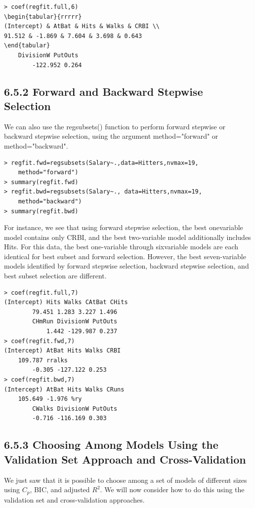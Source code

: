 \documentclass[10pt]{article}
\begin{document}
\begin{verbatim}
> coef(regfit.full,6)
\begin{tabular}{rrrrr} 
(Intercept) & AtBat & Hits & Walks & CRBI \\
91.512 & -1.869 & 7.604 & 3.698 & 0.643
\end{tabular}
    DivisionW PutOuts
        -122.952 0.264
\end{verbatim}

\subsection*{6.5.2 Forward and Backward Stepwise Selection}
We can also use the regsubsets() function to perform forward stepwise or backward stepwise selection, using the argument method="forward" or method="backward".

\begin{verbatim}
> regfit.fwd=regsubsets(Salary~.,data=Hitters,nvmax=19,
    method="forward")
> summary(regfit.fwd)
> regfit.bwd=regsubsets(Salary~., data=Hitters,nvmax=19,
    method="backward")
> summary(regfit.bwd)
\end{verbatim}

For instance, we see that using forward stepwise selection, the best onevariable model contains only CRBI, and the best two-variable model additionally includes Hits. For this data, the best one-variable through sixvariable models are each identical for best subset and forward selection. However, the best seven-variable models identified by forward stepwise selection, backward stepwise selection, and best subset selection are different.

\begin{verbatim}
> coef(regfit.full,7)
(Intercept) Hits Walks CAtBat CHits
        79.451 1.283 3.227 1.496
        CHmRun DivisionW PutOuts
            1.442 -129.987 0.237
> coef(regfit.fwd,7)
(Intercept) AtBat Hits Walks CRBI
    109.787 rralks 
        -0.305 -127.122 0.253
> coef(regfit.bwd,7)
(Intercept) AtBat Hits Walks CRuns
    105.649 -1.976 %ry 
        CWalks DivisionW PutOuts
        -0.716 -116.169 0.303
\end{verbatim}

\subsection*{6.5.3 Choosing Among Models Using the Validation Set Approach and Cross-Validation}
We just saw that it is possible to choose among a set of models of different sizes using $C_{p}$, BIC, and adjusted $R^{2}$. We will now consider how to do this using the validation set and cross-validation approaches.
\end{document}
